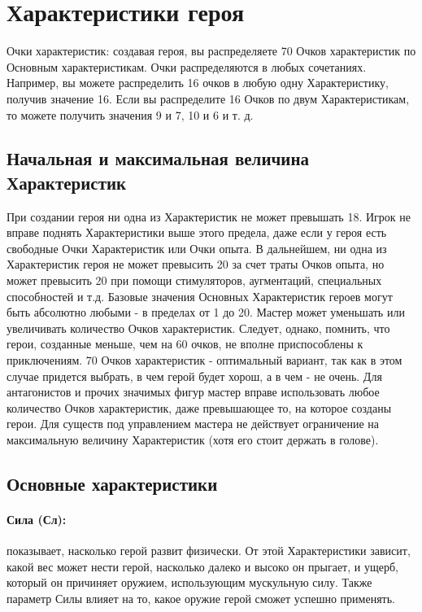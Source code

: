 \section{Характеристики героя}
Очки характеристик: создавая героя, вы распределяете 70 Очков характеристик по Основным характеристикам. Очки распределяются в любых сочетаниях. Например, вы можете распределить 16 очков в любую одну Характеристику, получив значение 16. Если вы распределите 16 Очков по двум Характеристикам, то можете получить значения 9 и 7, 10 и 6 и т. д.

\subsection{Начальная и максимальная величина Характеристик}
При создании героя ни одна из Характеристик не может превышать 18. Игрок не вправе поднять Характеристики выше этого предела, даже если у героя есть свободные Очки Характеристик или Очки опыта. В дальнейшем, ни одна из Характеристик героя не может превысить 20 за счет траты Очков опыта, но может превысить 20 при помощи стимуляторов, аугментаций, специальных способностей и т.д.
\newline Базовые значения Основных Характеристик героев могут быть абсолютно любыми - в пределах от 1 до 20.
\newline Мастер может уменьшать или увеличивать количество Очков характеристик. Следует, однако, помнить, что герои, созданные меньше, чем на 60 очков, не вполне приспособлены к приключениям. 70 Очков характеристик - оптимальный вариант, так как в этом случае придется выбрать, в чем герой будет хорош, а в чем - не очень.
\newline Для антагонистов и прочих значимых фигур мастер вправе использовать любое количество Очков характеристик, даже превышающее то, на которое созданы герои. Для существ под управлением мастера не действует ограничение на максимальную величину Характеристик (хотя его стоит держать в голове).

\subsection{Основные характеристики}
\paragraph{Сила (Сл):} показывает, насколько герой развит физически. От этой Характеристики зависит, какой вес может нести герой, насколько далеко и высоко он прыгает, и ущерб, который он причиняет оружием, использующим мускульную силу. Также параметр Силы влияет на то, какое оружие герой сможет успешно применять.

